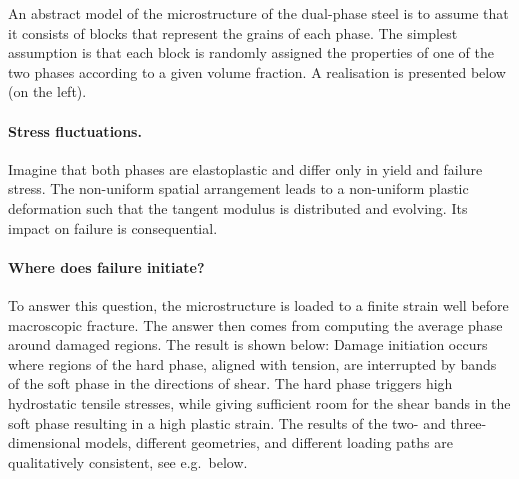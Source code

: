 \documentclass[pagenumbers=false, paragraphafter=none]{goose-article}
\begin{document}
An abstract model of the microstructure of the dual-phase steel is to assume that it consists of blocks that represent the grains of each phase.
The simplest assumption is that each block is randomly assigned the properties of one of the two phases according to a given volume fraction.
A realisation is presented below (on the left).

\paragraph{Stress fluctuations.}

Imagine that both phases are elastoplastic and differ only in yield and failure stress.
The non-uniform spatial arrangement leads to a non-uniform plastic deformation such that the tangent modulus is distributed and evolving.
Its impact on failure is consequential.

\paragraph{Where does failure initiate?}

To answer this question, the microstructure is loaded to a finite strain well before macroscopic fracture.
The answer then comes from computing the average phase around damaged regions.
The result is shown below: Damage initiation occurs where regions of the hard phase, aligned with tension, are interrupted by bands of the soft phase in the directions of shear.
The hard phase triggers high hydrostatic tensile stresses, while giving sufficient room for the shear bands in the soft phase resulting in a high plastic strain.
The results of the two- and three-dimensional models, different geometries, and different loading paths are qualitatively consistent, see e.g.~below.

\nocite{deGeus2016d,deGeus2016a,deGeus2017}


\renewcommand{\refname}{Selection of publications}

\end{document}
